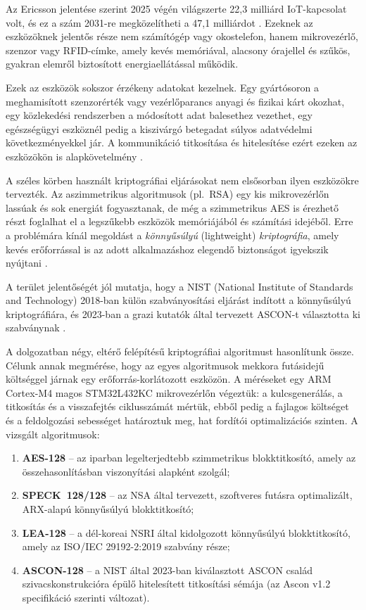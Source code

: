\documentclass[a4paper,12pt]{report}
\theoremstyle{definition}
\theoremstyle{remark}
\begin{document}
Az Ericsson jelentése szerint 2025 végén világszerte 22,3 milliárd IoT-kapcsolat volt, és ez a szám 2031-re megközelítheti a 47,1 milliárdot \cite{Ericsson2026}. Ezeknek az eszközöknek jelentős része nem számítógép vagy okostelefon, hanem mikrovezérlő, szenzor vagy RFID-címke, amely kevés memóriával, alacsony órajellel és szűkös, gyakran elemről biztosított energiaellátással működik.

Ezek az eszközök sokszor érzékeny adatokat kezelnek. Egy gyártósoron a meghamisított szenzorérték vagy vezérlőparancs anyagi és fizikai kárt okozhat, egy közlekedési rendszerben a módosított adat balesethez vezethet, egy egészségügyi eszköznél pedig a kiszivárgó betegadat súlyos adatvédelmi következményekkel jár. A kommunikáció titkosítása és hitelesítése ezért ezeken az eszközökön is alapkövetelmény \cite{Hossain2015}.

A széles körben használt kriptográfiai eljárásokat nem elsősorban ilyen eszközökre tervezték. Az aszimmetrikus algoritmusok (pl.~RSA) egy kis mikrovezérlőn lassúak és sok energiát fogyasztanak, de még a szimmetrikus AES is érezhető részt foglalhat el a legszűkebb eszközök memóriájából és számítási idejéből. Erre a problémára kínál megoldást a \emph{könnyűsúlyú} (lightweight) \emph{kriptográfia}, amely kevés erőforrással is az adott alkalmazáshoz elegendő biztonságot igyekszik nyújtani \cite{NISTIR8114}.

A terület jelentőségét jól mutatja, hogy a NIST (National Institute of Standards and Technology) 2018-ban külön szabványosítási eljárást indított a könnyűsúlyú kriptográfiára, és 2023-ban a grazi kutatók által tervezett ASCON-t választotta ki szabványnak \cite{NISTLWC2023}.

\bigskip

A dolgozatban négy, eltérő felépítésű kriptográfiai algoritmust hasonlítunk össze. Célunk annak megmérése, hogy az egyes algoritmusok mekkora futásidejű költséggel járnak egy erőforrás-korlátozott eszközön. A méréseket egy ARM Cortex-M4 magos STM32L432KC mikrovezérlőn végeztük: a kulcsgenerálás, a titkosítás és a visszafejtés ciklusszámát mértük, ebből pedig a fajlagos költséget és a feldolgozási sebességet határoztuk meg, hat fordítói optimalizációs szinten. A vizsgált algoritmusok:

\begin{enumerate}
	\item \textbf{AES-128} -- az iparban legelterjedtebb szimmetrikus blokktitkosító, amely az összehasonlításban viszonyítási alapként szolgál;
	\item \textbf{SPECK~128/128} -- az NSA által tervezett, szoftveres futásra optimalizált, ARX-alapú könnyűsúlyú blokktitkosító;
	\item \textbf{LEA-128} -- a dél-koreai NSRI által kidolgozott könnyűsúlyú blokktitkosító, amely az ISO/IEC 29192-2:2019 szabvány része;
	\item \textbf{ASCON-128} -- a NIST által 2023-ban kiválasztott ASCON család szivacskonstrukcióra épülő hitelesített titkosítási sémája (az Ascon v1.2 specifikáció szerinti változat).
\end{enumerate}
\end{document}
